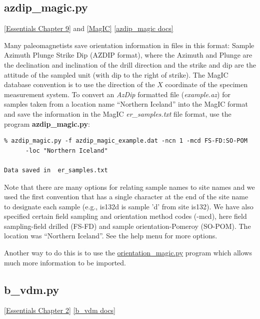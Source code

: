 \documentclass[11pt]{book}
\begin{document}
{{{
\subsection {azdip\_magic.py}
 \href{http://magician.ucsd.edu/Essentials_2/WebBook2ch9.html#ch9}{[Essentials Chapter 9]} and \href{#MagIC}{[MagIC]}%
 \href{http://earthref.org/PmagPy/pmagpydocs/azdip_magic-module.html}{[azdip\_magic docs]}

Many paleomagnetists save orientation information in files in this format:
Sample  Azimuth Plunge  Strike  Dip (AZDIP format),  where the Azimuth and Plunge are the declination and inclination of the drill direction and the strike and dip are the attitude of the sampled unit (with dip to the right of strike).   The MagIC database convention is to 
use the direction of the $X$ coordinate of the specimen measurement system.  To convert an  {\it AzDip} formatted file ({\it example.az}) for samples taken from a location name ``Northern Iceland''  into the MagIC format and save the information in the MagIC {\it er\_samples.txt}  file format, use the program {\bf azdip\_magic.py}:

\begin{verbatim}
% azdip_magic.py -f azdip_magic_example.dat -ncn 1 -mcd FS-FD:SO-POM
      -loc "Northern Iceland"

Data saved in  er_samples.txt
\end{verbatim}

Note that there are many options for relating sample names to site names and we used the first convention that has a single character at the end of the site name to designate each sample (e.g., is132d is sample 'd' from site is132).   We have also specified certain field sampling and orientation method codes (-mcd), here field sampling-field drilled (FS-FD) and sample orientation-Pomeroy (SO-POM).  The location was ``Northern Iceland''.   See the help menu for more options.   

Another way to do this is to use the \href{#orientation_magic.py}{orientation\_magic.py} program which allows much more information to be imported.  

\subsection{b\_vdm.py} 
\href{http://magician.ucsd.edu/Essentials_2/WebBook2ch2.html#Virtual_dipole_moment}{[Essentials Chapter 2]}
\href{http://earthref.org/PmagPy/pmagpydocs/b_vdm-module.html}{[b\_vdm docs]}

}}}
\end{document}
